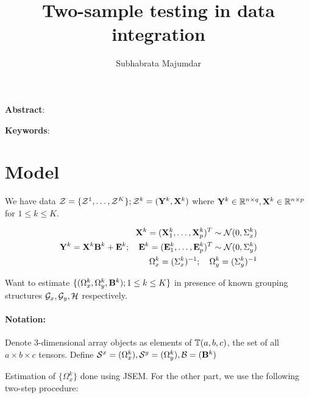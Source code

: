 \documentclass[fleqn,11pt]{article}
\numberwithin{equation}{section}
\begin{document}
\newtheorem{Theorem}{Theorem}[section]
\newtheorem{Lemma}[Theorem]{Lemma}
\newtheorem{Corollary}[Theorem]{Corollary}
\newtheorem{Proposition}[Theorem]{Proposition}
\newtheorem{Conjecture}[Theorem]{Conjecture}
\theoremstyle{definition} \newtheorem{Definition}[Theorem]{Definition}

\title{Two-sample testing in data integration}
\date{}
\author{Subhabrata Majumdar}
\maketitle

\noindent\textbf{Abstract}: 
\vspace{.5cm}

\noindent\textbf{Keywords}: 

\newpage

\section{Model}
We have data ${\cal{Z}} = \{ {\cal{Z}}^1, \ldots, {\cal{Z}}^K \}; {\cal{Z}}^k = ({\mathbf{Y}}^k, {\mathbf{X}}^k)$ where ${\mathbf{Y}}^k \in {\mathbb{R}}^{n \times q}, {\mathbf{X}}^k \in {\mathbb{R}}^{n \times p}$ for $1 \leq k \leq K$.

\begin{eqnarray}
{\mathbf{X}}^k = ({\mathbf{X}}^k_1, \ldots, {\mathbf{X}}^k_p)^T \sim {\cal{N}} (0, \Sigma^k_x)\\
{\mathbf{Y}}^k = {\mathbf{X}}^k {\mathbf{B}}^k + {\mathbf{E}}^k; \quad {\mathbf{E}}^k = ({\mathbf{E}}^k_1, \ldots, {\mathbf{E}}^k_p)^T \sim {\cal{N}} (0, \Sigma^k_y)\\
\Omega^k_x = (\Sigma^k_x)^{-1}; \quad \Omega^k_y = (\Sigma^k_y)^{-1}
\end{eqnarray}

Want to estimate $\{ (\Omega^k_x, \Omega^k_y, {\mathbf{B}}^k); 1 \leq k \leq K \}$ in presence of known grouping structures ${\cal{G}}_x, {\cal{G}}_y, {\cal{H}}$ respectively. 

\paragraph{Notation:} Denote 3-dimensional array objects as elements of ${\mathbb{T}}(a,b,c)$, the set of all $a \times b \times c$ tensors.
Define ${\cal{S}}^x = (\Omega^k_x), {\cal{S}}^y = (\Omega^k_y), {\cal{B}} = ({\mathbf{B}}^k)$


Estimation of $\{ \Omega_x^k \}$ done using JSEM. For the other part, we use the following two-step procedure:
\end{document}

